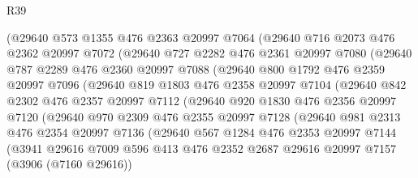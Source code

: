 \begin{lexlean}{R39}
\begin{coremodule}
          (@29640
            @573
            @1355
            @476
            @2363
            @20997
            @7064
            (@29640
              @716
              @2073
              @476
              @2362
              @20997
              @7072
              (@29640
                @727
                @2282
                @476
                @2361
                @20997
                @7080
                (@29640
                  @787
                  @2289
                  @476
                  @2360
                  @20997
                  @7088
                  (@29640
                    @800
                    @1792
                    @476
                    @2359
                    @20997
                    @7096
                    (@29640
                      @819
                      @1803
                      @476
                      @2358
                      @20997
                      @7104
                      (@29640
                        @842
                        @2302
                        @476
                        @2357
                        @20997
                        @7112
                        (@29640
                          @920
                          @1830
                          @476
                          @2356
                          @20997
                          @7120
                          (@29640
                            @970
                            @2309
                            @476
                            @2355
                            @20997
                            @7128
                            (@29640
                              @981
                              @2313
                              @476
                              @2354
                              @20997
                              @7136
                              (@29640
                                @567
                                @1284
                                @476
                                @2353
                                @20997
                                @7144
                                (@3941
                                  @29616
                                  @7009
                                  @596
                                  @413
                                  @476
                                  @2352
                                  @2687
                                  @29616
                                  @20997
                                  @7157
                                  (@3906 (@7160 @29616))

\end{coremodule}
\end{lexlean}
